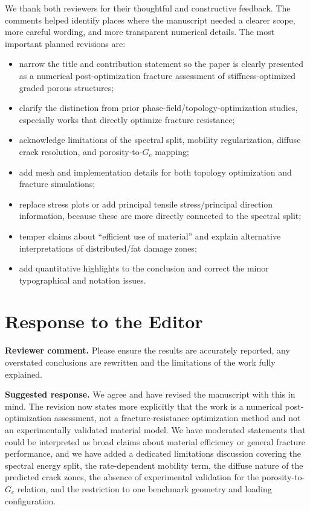 \documentclass[11pt,a4paper]{article}
\newcommand{\comment}[1]{\par\noindent\textbf{Reviewer comment.} #1\par}
\newcommand{\response}[1]{\par\noindent\textbf{Suggested response.} #1\par}
\begin{document}
We thank both reviewers for their thoughtful and constructive feedback. The
comments helped identify places where the manuscript needed a clearer scope,
more careful wording, and more transparent numerical details. The most important
planned revisions are:
\begin{itemize}
  \item narrow the title and contribution statement so the paper is clearly
  presented as a numerical post-optimization fracture assessment of
  stiffness-optimized graded porous structures;
  \item clarify the distinction from prior phase-field/topology-optimization
  studies, especially works that directly optimize fracture resistance;
  \item acknowledge limitations of the spectral split, mobility regularization,
  diffuse crack resolution, and porosity-to-\(G_c\) mapping;
  \item add mesh and implementation details for both topology optimization and
  fracture simulations;
  \item replace stress plots or add principal tensile stress/principal direction
  information, because these are more directly connected to the spectral split;
  \item temper claims about ``efficient use of material'' and explain
  alternative interpretations of distributed/fat damage zones;
  \item add quantitative highlights to the conclusion and correct the minor
  typographical and notation issues.
\end{itemize}

\section*{Response to the Editor}

\comment{Please ensure the results are accurately reported, any overstated
conclusions are rewritten and the limitations of the work fully explained.}

\response{We agree and have revised the manuscript with this in mind. The
revision now states more explicitly that the work is a numerical
post-optimization assessment, not a fracture-resistance optimization method and
not an experimentally validated material model. We have moderated statements
that could be interpreted as broad claims about material efficiency or general
fracture performance, and we have added a dedicated limitations discussion
covering the spectral energy split, the rate-dependent mobility term, the
diffuse nature of the predicted crack zones, the absence of experimental
validation for the porosity-to-\(G_c\) relation, and the restriction to one
benchmark geometry and loading configuration.}
\end{document}
